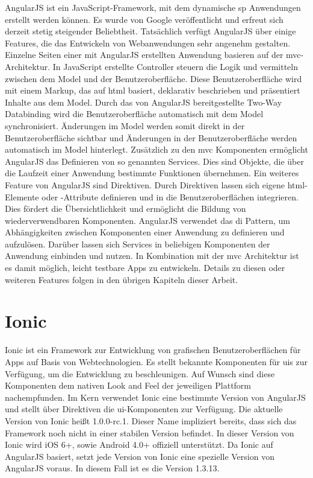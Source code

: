 AngularJS ist ein JavaScript-Framework, mit dem dynamische \gls{sp} Anwendungen erstellt werden können. Es wurde von Google veröffentlicht und erfreut sich derzeit stetig steigender Beliebtheit. Tatsächlich verfügt AngularJS über einige Features, die das Entwickeln von Webanwendungen sehr angenehm gestalten. Einzelne Seiten einer mit AngularJS erstellten Anwendung basieren auf der \gls{mvc}-Architektur. In JavaScript erstellte Controller steuern die Logik und vermitteln zwischen dem Model und der Benutzeroberfläche. Diese Benutzeroberfläche wird mit einem \gls{Markup}, das auf \gls{html} basiert, deklarativ beschrieben und präsentiert Inhalte aus dem Model. Durch das von AngularJS bereitgestellte Two-Way Databinding wird die Benutzeroberfläche automatisch mit dem Model synchronisiert. Änderungen im Model werden somit direkt in der Benutzeroberfläche sichtbar und Änderungen in der Benutzeroberfläche werden automatisch im Model hinterlegt. Zusätzlich zu den \gls{mvc} Komponenten ermöglicht AngularJS das Definieren von so genannten Services. Dies sind Objekte, die über die Laufzeit einer Anwendung bestimmte Funktionen übernehmen. Ein weiteres Feature von AngularJS sind Direktiven. Durch Direktiven lassen sich eigene \gls{html}-Elemente oder -Attribute definieren und in die Benutzeroberflächen integrieren. Dies fördert die Übersichtlichkeit und ermöglicht die Bildung von wiederverwendbaren Komponenten. AngularJS verwendet das \gls{di} Pattern, um Abhängigkeiten zwischen Komponenten einer Anwendung zu definieren und aufzulösen. Darüber lassen sich Services in beliebigen Komponenten der Anwendung einbinden und nutzen. In Kombination mit der \gls{mvc} Architektur ist es damit möglich, leicht testbare Apps zu entwickeln. Details zu diesen oder weiteren Features folgen in den übrigen Kapiteln dieser Arbeit.\cite{angularjs}

\section{Ionic}

Ionic ist ein Framework zur Entwicklung von grafischen Benutzeroberflächen für Apps auf Basis von Webtechnologien. Es stellt bekannte Komponenten für \glspl{ui} zur Verfügung, um die Entwicklung zu beschleunigen. Auf Wunsch sind diese Komponenten dem nativen \glqq Look and Feel\grqq{} der jeweiligen Plattform nachempfunden. Im Kern verwendet Ionic eine bestimmte Version von AngularJS und stellt über Direktiven die \gls{ui}-Komponenten zur Verfügung. Die aktuelle Version von Ionic heißt 1.0.0-rc.1. Dieser Name impliziert bereits, dass sich das Framework noch nicht in einer stabilen Version befindet. In dieser Version von Ionic wird iOS 6+, sowie Android 4.0+ offiziell unterstützt. Da Ionic auf AngularJS basiert, setzt jede Version von Ionic eine spezielle Version von AngularJS voraus. In diesem Fall ist es die Version 1.3.13.\cite{ionic}